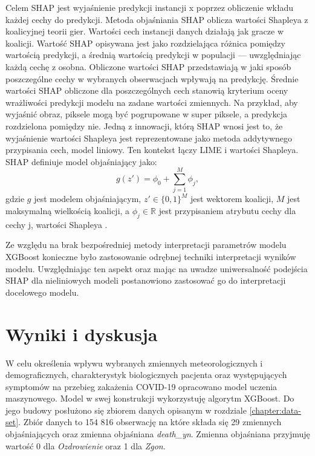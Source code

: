 \documentclass[polish, twoside, 12pt, a4paper]{article}
\theoremstyle{definition}
\theoremstyle{plain}
\theoremstyle{remark}
\begin{document}

Celem SHAP jest wyjaśnienie predykcji instancji x poprzez obliczenie wkładu każdej cechy do predykcji. Metoda objaśniania SHAP oblicza wartości Shapleya z koalicyjnej teorii gier. Wartości cech instancji danych działają jak gracze w koalicji. Wartość SHAP opisywana jest jako rozdzielająca różnica pomiędzy wartością predykcji, a średnią wartością predykcji w populacji --- uwzględniając każdą cechę z osobna. Obliczone wartości SHAP przedstawiają w jaki sposób poszczególne cechy w wybranych obserwacjach wpływają na predykcję. Średnie wartości SHAP obliczone dla poszczególnych cech stanowią kryterium oceny wrażliwości predykcji modelu na zadane wartości zmiennych. Na przykład, aby wyjaśnić obraz, piksele mogą być pogrupowane w super piksele, a predykcja rozdzielona pomiędzy nie. Jedną z innowacji, którą SHAP wnosi jest to, że wyjaśnienie wartości Shapleya jest reprezentowane jako metoda addytywnego przypisania cech, model liniowy. Ten kontekst łączy LIME i wartości Shapleya. SHAP definiuje model objaśniający jako:
\[ g(z') =  \phi_0 + \sum_{j=1}^{M}\phi_j, \]
gdzie \(g\) jest modelem objaśniającym, \( z'\in\{0,1\}^{M}\)  jest wektorem koalicji, \(M\) jest maksymalną wielkością koalicji, a \( \phi_j \in\mathbb{R}\) jest przypisaniem atrybutu cechy dla cechy j, wartości Shapleya \citep{lundberg2017}.

Ze względu na brak bezpośredniej metody interpretacji parametrów modelu XGBoost konieczne było zastosowanie odrębnej techniki interpretacji wyników modelu. Uwzględniając ten aspekt oraz mając na uwadze uniwersalność podejścia SHAP dla nieliniowych modeli postanowiono zastosować go do interpretacji docelowego modelu.


\clearpage
\section{Wyniki i dyskusja}


W celu określenia wpływu wybranych zmiennych meteorologicznych i demograficznych, charakterystyk biologicznych pacjenta oraz występujących symptomów na przebieg zakażenia COVID-19 opracowano model uczenia maszynowego. Model w swej konstrukcji wykorzystuję algorytm XGBoost. Do jego budowy posłużono się zbiorem danych opisanym w rozdziale \ref{chapter:data-set}. Zbiór danych to 154 816 obserwację na które składa się 29 zmiennych objaśniających oraz zmienna objaśniana \emph{death\_yn}. Zmienna objaśniana przyjmuję wartość 0 dla \emph{Ozdrowienie} oraz 1 dla \emph{Zgon}.
\end{document}
